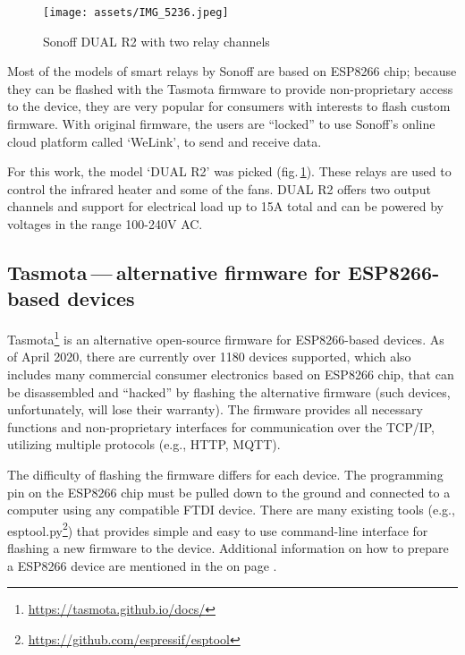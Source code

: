 \begin{figure}[h]{}
    \centering\texttt{[image: assets/IMG\_5236.jpeg]}
    \caption{Sonoff DUAL R2 with two relay channels}
    \label{dualr2}
\end{figure}

\pagebreak

Most of the models of smart relays by Sonoff are based on ESP8266 chip;
because they can be flashed with the Tasmota firmware to provide non-proprietary
access to the device, they are very popular for consumers with interests to
flash custom firmware. With original firmware, the users are ``locked'' to use
Sonoff’s online cloud platform called `WeLink', to send and receive data.

For this work, the model `DUAL R2' was picked (fig.\,\ref{dualr2}). 
These relays are used to
control the infrared heater and some of the fans. DUAL R2 offers two output
channels and support for electrical load up to 15A total and can be powered
by voltages in the range 100-240V AC.

\hypertarget{x-tasmota — alternative-firmware-for-esp8266-based-devices}{\subsection{Tasmota — alternative firmware for ESP8266-based devices}}
Tasmota\footnote{\href{https://tasmota.github.io/docs/}{https://tasmota.github.io/docs/}} is an alternative open-source 
firmware for ESP8266-based devices.
As of April 2020, there are currently over 1180 devices supported,\cite{tasdirec}
which also includes many commercial consumer electronics based on ESP8266 chip,
that can be disassembled and ``hacked'' by flashing the alternative firmware
(such devices, unfortunately, will lose their warranty).
The firmware provides all necessary functions and non-proprietary
interfaces for communication over the TCP/IP, utilizing multiple protocols
(e.g., HTTP, MQTT).


The difficulty of flashing the firmware differs for each device. The programming pin
on the ESP8266 chip must be pulled down to the ground and connected to a computer using
any compatible FTDI device. There are many existing tools (e.g., 
esptool.py\footnote{\href{https://github.com/espressif/esptool}{https://github.com/espressif/esptool}})
that provides simple and easy to use command-line
interface for flashing a new firmware to the device. Additional information
on how to prepare a ESP8266 device are mentioned in the 
 on page \pageref{installguide}.

